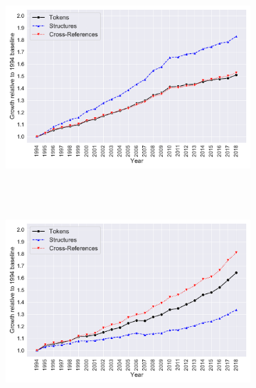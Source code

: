 \documentclass[varwidth, border=0pt]{standalone}
\begin{document}
	
	\begin{figure}
	\centering
\begin{subfigure}{0.5\linewidth}
	\includegraphics[width=\linewidth]{../../graphics/us-tokens-structures-crossrefs-growth-rel.pdf}~%
\end{subfigure}~%
\begin{subfigure}{0.5\linewidth}
	\includegraphics[width=\linewidth]{../../graphics/de-tokens-structures-crossrefs-growth-rel.pdf}~%
\end{subfigure}
	\end{figure}
	
\end{document}
